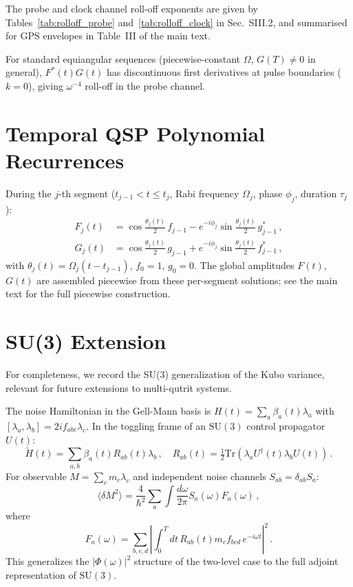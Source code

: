 \documentclass[aps,pra,twocolumn,superscriptaddress,longbibliography]{revtex4-2}
\newcommand{\be}{\begin{equation}}
\newcommand{\ee}{\end{equation}}
\begin{document}
The probe and clock channel roll-off exponents are given by Tables~\ref{tab:rolloff_probe}
and~\ref{tab:rolloff_clock} in Sec.~SIII.2, and summarised for GPS envelopes in
Table~III of the main text.

For standard equiangular sequences (piecewise-constant $\Omega$, $G(T)\neq 0$ in general),
$F^*(t)G(t)$ has discontinuous first derivatives at pulse boundaries ($k=0$),
giving $\omega^{-4}$ roll-off in the probe channel.


\section{Temporal QSP Polynomial Recurrences}
\label{supp:recurrences}

During the $j$-th segment ($t_{j-1} < t \leq t_j$, Rabi frequency $\Omega_j$,
phase $\phi_j$, duration $\tau_j$):
\begin{align}
  F_j(t) &= \cos\tfrac{\theta_j(t)}{2}\,f_{j-1} - e^{-i\phi_j}\sin\tfrac{\theta_j(t)}{2}\,g_{j-1}^*\,, \\
  G_j(t) &= \cos\tfrac{\theta_j(t)}{2}\,g_{j-1} + e^{-i\phi_j}\sin\tfrac{\theta_j(t)}{2}\,f_{j-1}^*\,,
\end{align}
with $\theta_j(t) = \Omega_j(t-t_{j-1})$, $f_0 = 1$, $g_0 = 0$.
The global amplitudes $F(t)$, $G(t)$ are assembled piecewise from these per-segment
solutions; see the main text for the full piecewise construction.


\section{SU(3) Extension}
\label{supp:su3}

For completeness, we record the SU(3) generalization of the Kubo variance,
relevant for future extensions to multi-qutrit systems.

The noise Hamiltonian in the Gell-Mann basis is $H(t) = \sum_a \beta_a(t)\lambda_a$ with
$[\lambda_a,\lambda_b] = 2if_{abc}\lambda_c$.
In the toggling frame of an $\mathrm{SU}(3)$ control propagator $U(t)$:
\be
  \tilde{H}(t) = \sum_{a,b}\beta_a(t)R_{ab}(t)\lambda_b\,,\quad
  R_{ab}(t) = \tfrac{1}{2}\mathrm{Tr}(\lambda_a U^\dagger(t)\lambda_b U(t))\,.
\ee
For observable $M = \sum_c m_c\lambda_c$ and independent noise channels $S_{ab} = \delta_{ab}S_a$:
\be
  \langle\delta M^2\rangle = \frac{4}{\hbar^2}\sum_a\int\frac{d\omega}{2\pi}S_a(\omega)F_a(\omega)\,,
\ee
where
\be
  F_a(\omega) = \sum_{b,c,d}\left|\int_0^T dt\,R_{ab}(t)m_c f_{bcd}\,e^{-i\omega t}\right|^2\,.
\ee
This generalizes the $|\Phi(\omega)|^2$ structure of the two-level case to the full
adjoint representation of $\mathrm{SU}(3)$.


\end{document}
